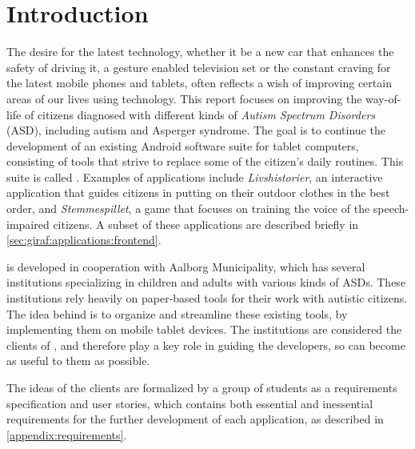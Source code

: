 \newcommand{\headerIntroduction}{Introduction}
\chapter*{\headerIntroduction}\label{chap:introduction}
\addcontentsline{toc}{chapter}{\headerIntroduction}

The desire for the latest technology, whether it be a new car that enhances the safety of driving it, a gesture enabled television set or the constant craving for the latest mobile phones and tablets, often reflects a wish of improving certain areas of our lives using technology.
This report focuses on improving the way-of-life of citizens diagnosed with different kinds of \textit{Autism Spectrum Disorders} (ASD), including autism and Asperger syndrome.
The goal is to continue the development of an existing Android software suite for tablet computers, consisting of tools that strive to replace some of the citizen's daily routines. 
This suite is called \giraf.
Examples of \giraf applications include \textit{Livshistorier}, an interactive application that guides citizens in putting on their outdoor clothes in the best order, and \textit{Stemmespillet}, a game that focuses on training the voice of the speech-impaired citizens.
A subset of these applications are described briefly in \cref{sec:giraf:applications:frontend}.

\giraf is developed in cooperation with Aalborg Municipality, which has several institutions specializing in children and adults with various kinds of ASDs.
These institutions rely heavily on paper-based tools for their work with autistic citizens.
The idea behind \giraf is to organize and streamline these existing tools, by implementing them on mobile tablet devices.
The institutions are considered the clients of \giraf, and therefore play a key role in guiding the developers, so \giraf can become as useful to them as possible.

The ideas of the clients are formalized by a group of students as a requirements specification and user stories, which contains both essential and inessential requirements for the further development of each application, as described in \cref{appendix:requirements}.